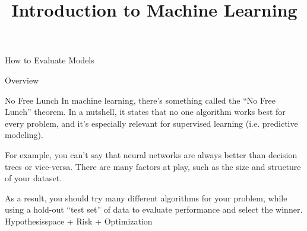 \documentclass[11pt,compress,t,notes=noshow, xcolor=table]{beamer}
\title{Introduction to Machine Learning}
\institute{\href{https://compstat-lmu.github.io/lecture_i2ml/}{compstat-lmu.github.io/lecture\_i2ml}}
\date{}
\begin{document}

















\begin{vbframe}{How to Evaluate Models}


 \end{vbframe}

\begin{frame}{Overview}

No Free Lunch
In machine learning, there’s something called the “No Free Lunch” theorem. In a nutshell, it states that no one algorithm works best for every problem, and it’s especially relevant for supervised learning (i.e. predictive modeling).

For example, you can’t say that neural networks are always better than decision trees or vice-versa. There are many factors at play, such as the size and structure of your dataset.

As a result, you should try many different algorithms for your problem, while using a hold-out “test set” of data to evaluate performance and select the winner.
\lz
\lz
Hypothesisspace + Risk + Optimization 
\end{frame}


\end{document}
